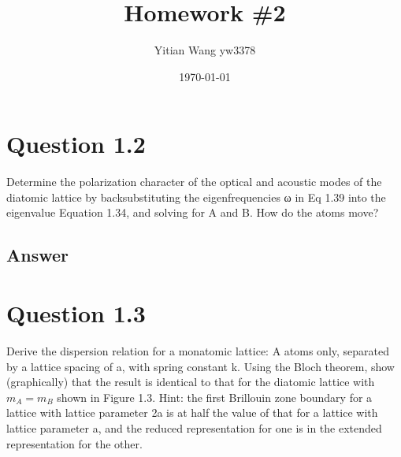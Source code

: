 \documentclass[
	12pt, %
]{fphw}
\title{Homework \#2} %
\author{Yitian Wang yw3378} %
\date{\today} %
\institute{Columbia University} %
\begin{document}
\maketitle %


\section*{Question 1.2}

\begin{problem}
Determine the polarization character of the optical and acoustic modes
of the diatomic lattice by backsubstituting the eigenfrequencies ω in
Eq 1.39 into the eigenvalue Equation 1.34, and solving for A and B.
How do the atoms move?
\end{problem}


\subsection*{Answer}




\section*{Question 1.3}

\begin{problem}
Derive the dispersion relation for a monatomic lattice: A atoms only,
separated by a lattice spacing of a, with spring constant k. Using the
Bloch theorem, show (graphically) that the result is identical to that
for the diatomic lattice with $m_A = m_B$ shown in Figure 1.3. Hint: the
first Brillouin zone boundary for a lattice with lattice parameter 2a
is at half the value of that for a lattice with lattice parameter a, and
the reduced representation for one is in the extended representation
for the other.

\end{problem}

\end{document}
